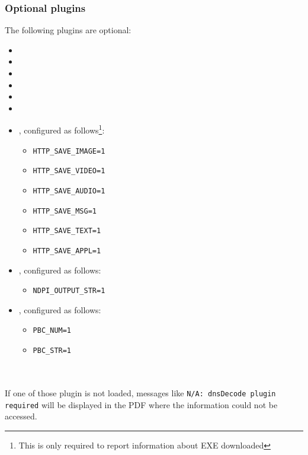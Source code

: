 \documentclass[documentation]{subfiles}
\begin{document}
    \subsubsection{Optional plugins}
        The following plugins are optional:
        \begin{multicols}{3}
            \begin{itemize}
                \item {}
                \item {}
                \item {}
                \item {}
                \item {}
                \item {}
                \item {}, configured as follows\footnote{This is only required to report information about EXE downloaded}:
                    \begin{itemize}
                        \item {\tt HTTP\_SAVE\_IMAGE=1}
                        \item {\tt HTTP\_SAVE\_VIDEO=1}
                        \item {\tt HTTP\_SAVE\_AUDIO=1}
                        \item {\tt HTTP\_SAVE\_MSG=1}
                        \item {\tt HTTP\_SAVE\_TEXT=1}
                        \item {\tt HTTP\_SAVE\_APPL=1}
                    \end{itemize}
                \item {}, configured as follows:
                    \begin{itemize}
                        \item {\tt NDPI\_OUTPUT\_STR=1}
                    \end{itemize}
                \item {}, configured as follows:
                    \begin{itemize}
                        \item {\tt PBC\_NUM=1}
                        \item {\tt PBC\_STR=1}
                    \end{itemize}
            \end{itemize}
        \end{multicols}
~\\\\
If one of those plugin is not loaded, messages like {\tt N/A: dnsDecode plugin required} will be displayed in the PDF where the information could not be accessed.
\end{document}
